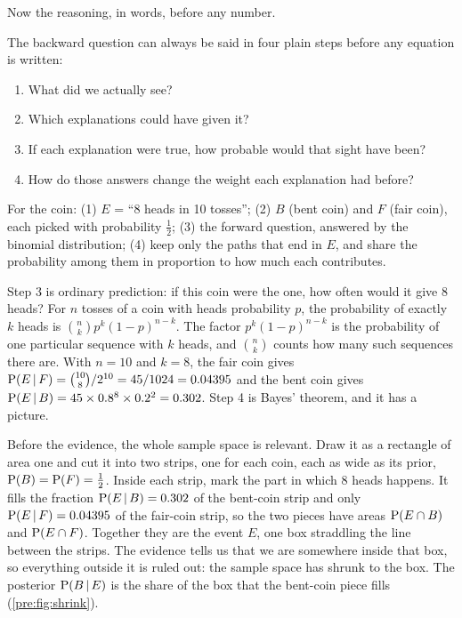 Now the reasoning, in words, before any number.

\begin{reasoning}
The backward question can always be said in four plain steps before any
equation is written:
\begin{enumerate}
  \item What did we actually see?
  \item Which explanations could have given it?
  \item If each explanation were true, how probable would that sight have been?
  \item How do those answers change the weight each explanation had before?
\end{enumerate}
For the coin: (1) $E$ = ``8 heads in 10 tosses''; (2) $B$ (bent coin) and $F$
(fair coin), each picked with probability $\tfrac12$; (3) the forward
question, answered by the binomial distribution; (4) keep only the paths that
end in $E$, and share the probability among them in proportion to how much
each contributes.

\smallskip{}
\end{reasoning}

Step 3 is ordinary prediction: if this coin were the one, how often would it
give 8 heads? For $n$ tosses of a coin with heads probability $p$, the
probability of exactly $k$ heads is $\binom nk p^k(1-p)^{n-k}$. The factor
$p^k(1-p)^{n-k}$ is the probability of one particular sequence with $k$ heads,
and $\binom nk$ counts how many such sequences there are. With $n=10$ and
$k=8$, the fair coin gives $\operatorname{P}(E\,\vert\, F)=\binom{10}{8}/2^{10}=45/1024
=0.04395$ and the bent coin gives
$\operatorname{P}(E\,\vert\, B)=45\times0.8^8\times0.2^2=0.302$. Step 4 is Bayes'
theorem, and it has a picture.

\begin{intuition}
Before the evidence, the whole sample space is relevant. Draw it as a
rectangle of area one and cut it into two strips, one for each coin, each as
wide as its prior, $\operatorname{P}(B)=\operatorname{P}(F)=\tfrac12$. Inside each strip, mark the part
in which 8 heads happens. It fills the fraction $\operatorname{P}(E\,\vert\, B)=0.302$
of the bent-coin strip and only $\operatorname{P}(E\,\vert\, F)=0.04395$ of the fair-coin
strip, so the two pieces have areas $\operatorname{P}(E\cap B)$ and $\operatorname{P}(E\cap F)$.
Together they are the event $E$, one box straddling the line between the
strips. The evidence tells us that we are somewhere inside that box, so
everything outside it is ruled out: the sample space has shrunk to the box.
The posterior $\operatorname{P}(B\,\vert\, E)$ is the share of the box that the bent-coin
piece fills (\cref{pre:fig:shrink}).

\smallskip{}
\end{intuition}

